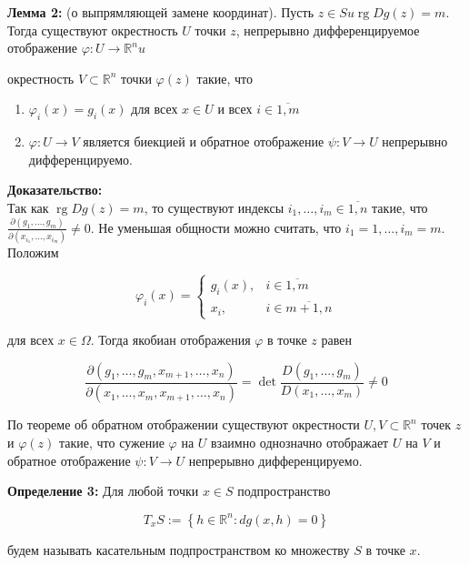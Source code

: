 \documentclass[a4paper,12pt]{article} %
\begin{document}
\textbf{Лемма 2:} (о выпрямляющей замене координат). Пусть $z \in S u \operatorname{rg} D g(z)=m$. Тогда существуют окрестность $U$ точки $z$, непрерывно дифференцируемое отображение $\varphi: U \rightarrow \mathbb{R}^{n} u$

окрестность $V \subset \mathbb{R}^{n}$ точки $\varphi(z)$ такие, что

\begin{enumerate}
\item $\varphi_{i}(x)=g_{i}(x)$ для всех $x \in U$ и всех $i \in \overline{1, m}$

\item $\varphi: U \rightarrow V$ является биекцией и обратное отображение $\psi: V \rightarrow U$ непрерывно дифференцируемо.

\end{enumerate}

\textbf{Доказательство:}\\
Так как $\operatorname{rg} D g(z)=m$, то существуют индексы $i_{1}, \ldots, i_{m} \in \overline{1, n}$ такие, что $\frac{\partial\left(g_{1}, \ldots, g_{m}\right)}{\partial\left(x_{i_{1}}, \ldots, x_{i_{m}}\right)} \neq 0$. Не уменьшая общности можно считать, что $i_{1}=1, \ldots, i_{m}=m$. Положим

$$
\varphi_{i}(x)= \begin{cases}g_{i}(x), & i \in \overline{1, m} \\ x_{i}, & i \in \overline{m+1, n}\end{cases}
$$

для всех $x \in \Omega$. Тогда якобиан отображения $\varphi$ в точке $z$ равен

$$
\frac{\partial\left(g_{1}, \ldots, g_{m}, x_{m+1}, \ldots, x_{n}\right)}{\partial\left(x_{1}, \ldots, x_{m}, x_{m+1}, \ldots, x_{n}\right)}=\operatorname{det} \frac{D\left(g_{1}, \ldots, g_{m}\right)}{D\left(x_{1}, \ldots, x_{m}\right)} \neq 0
$$

По теореме об обратном отображении существуют окрестности $U, V \subset \mathbb{R}^{n}$ точек $z$ и $\varphi(z)$ такие, что сужение $\varphi$ на $U$ взаимно однозначно отображает $U$ на $V$ и обратное отображение $\psi: V \rightarrow U$ непрерывно дифференцируемо.

\textbf{Определение 3:} Для любой точки $x \in S$ подпространство

$$
T_{x} S:=\left\{h \in \mathbb{R}^{n}: d g(x, h)=0\right\}
$$

будем называть касательным подпространством ко множеству $S$ в точке $x$.
\end{document}
